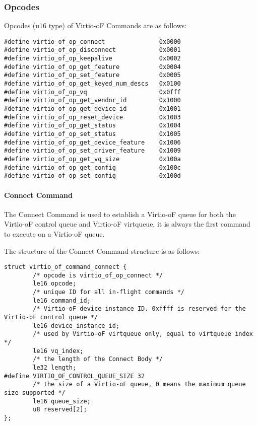 \subsubsection{Opcodes}\label{sec:Virtio Transport Options / Virtio Over Fabrics / Commands Definition / Opcodes}
Opcodes (u16 type) of Virtio-oF Commands are as follows:

\begin{lstlisting}
#define virtio_of_op_connect               0x0000
#define virtio_of_op_disconnect            0x0001
#define virtio_of_op_keepalive             0x0002
#define virtio_of_op_get_feature           0x0004
#define virtio_of_op_set_feature           0x0005
#define virtio_of_op_get_keyed_num_descs   0x0100
#define virtio_of_op_vq                    0x0fff
#define virtio_of_op_get_vendor_id         0x1000
#define virtio_of_op_get_device_id         0x1001
#define virtio_of_op_reset_device          0x1003
#define virtio_of_op_get_status            0x1004
#define virtio_of_op_set_status            0x1005
#define virtio_of_op_get_device_feature    0x1006
#define virtio_of_op_set_driver_feature    0x1009
#define virtio_of_op_get_vq_size           0x100a
#define virtio_of_op_get_config            0x100c
#define virtio_of_op_set_config            0x100d
\end{lstlisting}

\paragraph{Connect Command}\label{sec:Virtio Transport Options / Virtio Over Fabrics / Commands Definition / Opcodes / Connect Command}

The Connect Command is used to establish a Virtio-oF queue for both the Virtio-oF control queue and Virtio-oF virtqueue, it is always the first command to execute on a Virtio-oF queue.

The structure of the Connect Command structure is as follows:
\begin{lstlisting}
struct virtio_of_command_connect {
        /* opcode is virtio_of_op_connect */
        le16 opcode;
        /* unique ID for all in-flight commands */
        le16 command_id;
        /* Virtio-oF device instance ID. 0xffff is reserved for the Virtio-oF control queue */
        le16 device_instance_id;
        /* used by Virtio-oF virtqueue only, equal to virtqueue index */
        le16 vq_index;
        /* the length of the Connect Body */
        le32 length;
#define VIRTIO_OF_CONTROL_QUEUE_SIZE 32
        /* the size of a Virtio-oF queue, 0 means the maximum queue size supported */
        le16 queue_size;
        u8 reserved[2];
};
\end{lstlisting}

